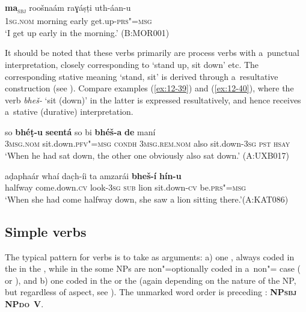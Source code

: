 \begin{exe}
\ex
\label{ex:12-38}
\gll {\ob}\textbf{ma}{\cb}\textsubscript{\textsc{\upshape sbj}} roošnaám raɣáṣṭi uth-áan-u  \\
1\textsc{sg.nom} morning early get.up-\textsc{prs"=msg} \\
\glt `I get up early in the morning.' (B:MOR001)
\end{exe}

It should be noted that these verbs primarily are process verbs with a~punctual interpretation, closely corresponding to \iliEnglish `stand up, sit down' etc. The corresponding stative meaning `stand, sit' is derived through a~resultative construction (see ). Compare examples (\ref{ex:12-39}) and (\ref{ex:12-40}), where the verb \textit{bheš-} `sit (down)' in the latter is expressed resultatively, and hence receives a~stative (durative) interpretation.

\begin{exe}
\ex
\label{ex:12-39}
\gll so \textbf{bhéṭ-u} \textbf{seentá} so bi \textbf{bhéš-a} \textbf{de} maní \\
\textsc{3msg.nom} sit.down.\textsc{pfv"=msg} \textsc{condh} \textsc{3msg.rem.nom} also  sit.down-\textsc{3sg} \textsc{pst } \textsc{hsay} \\
\glt `When he had sat down, the other one obviously also sat down.' (A:UXB017)

\ex
\label{ex:12-40}
\gll aḍaphaár whaí dac̣h-íi ta amzarái \textbf{bheš-í} \textbf{hín-u} \\
halfway come.down.\textsc{cv} look-\textsc{3sg } \textsc{sub} lion sit.down-\textsc{cv} be.\textsc{prs"=msg} \\
\glt `When she had come halfway down, she saw a lion sitting there.'\newline (A:KAT086)
\end{exe}

\subsection{Simple  verbs}
\label{subsec:12-2-3}


The typical pattern for  verbs is to take as arguments: a) one   , always coded in the  in the , while in the  some NPs are non"=optionally coded in a~non"= case ( or ), and b) one    coded in the  or the  (again depending on the nature of the NP, but regardless of aspect, see ). The unmarked word order is  preceding : \textbf{NP\textsc{sbj}} \textbf{NP\textsc{do}}~\textbf{V}.


